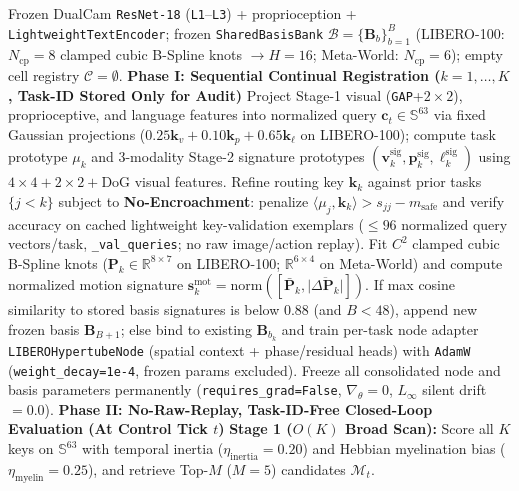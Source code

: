 \documentclass[10pt]{article}
\begin{document}
\begin{algorithm}[ht!]
\caption{\textbf{DTRA Training Registration \& Closed-Loop Control (LIBERO-100 Implementation)}}
\label{alg:dtra_v3}
\small
\begin{algorithmic}[1]
\Require Frozen DualCam \texttt{ResNet-18} (\texttt{L1}--\texttt{L3}) + proprioception + \texttt{LightweightTextEncoder}; frozen \texttt{SharedBasisBank} $\mathcal{B} = \{\mathbf{B}_b\}_{b=1}^{B}$ (LIBERO-100: $N_{\text{cp}}=8$ clamped cubic B-Spline knots $\to H=16$; Meta-World: $N_{\text{cp}}=6$); empty cell registry $\mathcal{C} = \emptyset$.
\Statex \textbf{Phase I: Sequential Continual Registration ($k = 1, \dots, K$, Task-ID Stored Only for Audit)}
\State Project Stage-1 visual (\texttt{GAP}+$2\times 2$), proprioceptive, and language features into normalized query $\mathbf{c}_t \in \mathbb{S}^{63}$ via fixed Gaussian projections ($0.25\mathbf{k}_v + 0.10\mathbf{k}_p + 0.65\mathbf{k}_\ell$ on LIBERO-100); compute task prototype $\mu_k$ and 3-modality Stage-2 signature prototypes $(\mathbf{v}_k^{\text{sig}}, \mathbf{p}_k^{\text{sig}}, \boldsymbol{\ell}_k^{\text{sig}})$ using $4\times 4+2\times 2+\text{DoG}$ visual features.
\State Refine routing key $\mathbf{k}_k$ against prior tasks $\{j < k\}$ subject to \textbf{No-Encroachment}: penalize $\langle \mu_j, \mathbf{k}_k \rangle > s_{jj} - m_{\text{safe}}$ and verify accuracy on cached lightweight key-validation exemplars ($\le 96$ normalized query vectors/task, \texttt{\_val\_queries}; no raw image/action replay).
\State Fit $C^2$ clamped cubic B-Spline knots ($\mathbf{P}_k \in \mathbb{R}^{8\times 7}$ on LIBERO-100; $\mathbb{R}^{6\times 4}$ on Meta-World) and compute normalized motion signature $\mathbf{s}_k^{\text{mot}} = \mathrm{norm}([\bar{\mathbf{P}}_k, \overline{|\Delta\mathbf{P}_k|}])$. If max cosine similarity to stored basis signatures is below $0.88$ (and $B < 48$), append new frozen basis $\mathbf{B}_{B+1}$; else bind to existing $\mathbf{B}_{b_k}$ and train per-task node adapter \texttt{LIBEROHypertubeNode} (spatial context + phase/residual heads) with \texttt{AdamW} (\texttt{weight\_decay=1e-4}, frozen params excluded).
\State Freeze all consolidated node and basis parameters permanently (\texttt{requires\_grad=False}, $\nabla_\theta = 0$, $L_\infty$ silent drift $= 0.0$).
\Statex \textbf{Phase II: No-Raw-Replay, Task-ID-Free Closed-Loop Evaluation (At Control Tick $t$)}
\State \textbf{Stage 1 ($O(K)$ Broad Scan):} Score all $K$ keys on $\mathbb{S}^{63}$ with temporal inertia ($\eta_{\text{inertia}}=0.20$) and Hebbian myelination bias ($\eta_{\text{myelin}}=0.25$), and retrieve Top-$M$ ($M=5$) candidates $\mathcal{M}_t$.

\end{algorithmic}
\end{algorithm}
\end{document}
